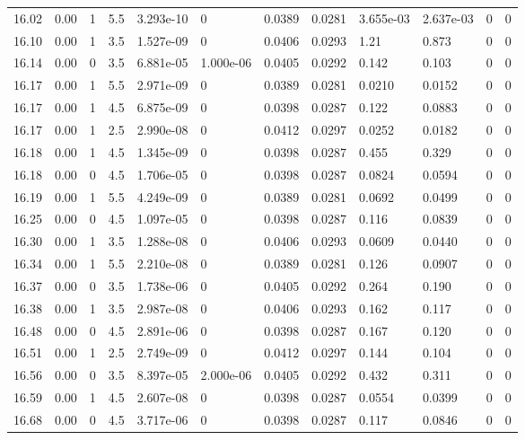 \documentclass[preview]{standalone}
\begin{document}
{{{{{{{{{{{\begin{tabular}{L{1.2cm}C{1.2cm} C{0.3cm}C{0.5cm} C{1.4cm}C{1.4cm} C{1.4cm}C{1.4cm} C{1.6cm}C{1.6cm} C{1.6cm}C{1.6cm}}
  16.02  &  0.00  & 1     & 5.5 &  3.293e-10  & 0  &  0.0389&   0.0281& 3.655e-03 & 2.637e-03   &  0 & 0  \\ 
  16.10  &  0.00  & 1     & 3.5 &  1.527e-09  & 0  &  0.0406&   0.0293& 1.21 & 0.873   &  0 & 0  \\ 
  16.14  &  0.00  & 0     & 3.5 &  6.881e-05  & 1.000e-06  &  0.0405&   0.0292& 0.142 & 0.103   &  0 & 0  \\ 
  16.17  &  0.00  & 1     & 5.5 &  2.971e-09  & 0  &  0.0389&   0.0281& 0.0210 & 0.0152   &  0 & 0  \\ 
  16.17  &  0.00  & 1     & 4.5 &  6.875e-09  & 0  &  0.0398&   0.0287& 0.122 & 0.0883   &  0 & 0  \\ 
  16.17  &  0.00  & 1     & 2.5 &  2.990e-08  & 0  &  0.0412&   0.0297& 0.0252 & 0.0182   &  0 & 0  \\ 
  16.18  &  0.00  & 1     & 4.5 &  1.345e-09  & 0  &  0.0398&   0.0287& 0.455 & 0.329   &  0 & 0  \\ 
  16.18  &  0.00  & 0     & 4.5 &  1.706e-05  & 0  &  0.0398&   0.0287& 0.0824 & 0.0594   &  0 & 0  \\ 
  16.19  &  0.00  & 1     & 5.5 &  4.249e-09  & 0  &  0.0389&   0.0281& 0.0692 & 0.0499   &  0 & 0  \\ 
  16.25  &  0.00  & 0     & 4.5 &  1.097e-05  & 0  &  0.0398&   0.0287& 0.116 & 0.0839   &  0 & 0  \\ 
  16.30  &  0.00  & 1     & 3.5 &  1.288e-08  & 0  &  0.0406&   0.0293& 0.0609 & 0.0440   &  0 & 0  \\ 
  16.34  &  0.00  & 1     & 5.5 &  2.210e-08  & 0  &  0.0389&   0.0281& 0.126 & 0.0907   &  0 & 0  \\ 
  16.37  &  0.00  & 0     & 3.5 &  1.738e-06  & 0  &  0.0405&   0.0292& 0.264 & 0.190   &  0 & 0  \\ 
  16.38  &  0.00  & 1     & 3.5 &  2.987e-08  & 0  &  0.0406&   0.0293& 0.162 & 0.117   &  0 & 0  \\ 
  16.48  &  0.00  & 0     & 4.5 &  2.891e-06  & 0  &  0.0398&   0.0287& 0.167 & 0.120   &  0 & 0  \\ 
  16.51  &  0.00  & 1     & 2.5 &  2.749e-09  & 0  &  0.0412&   0.0297& 0.144 & 0.104   &  0 & 0  \\ 
  16.56  &  0.00  & 0     & 3.5 &  8.397e-05  & 2.000e-06  &  0.0405&   0.0292& 0.432 & 0.311   &  0 & 0  \\ 
  16.59  &  0.00  & 1     & 4.5 &  2.607e-08  & 0  &  0.0398&   0.0287& 0.0554 & 0.0399   &  0 & 0  \\ 
  16.68  &  0.00  & 0     & 4.5 &  3.717e-06  & 0  &  0.0398&   0.0287& 0.117 & 0.0846   &  0 & 0  \\ 

\end{tabular}}}}}}}}}}}}
\end{document}
